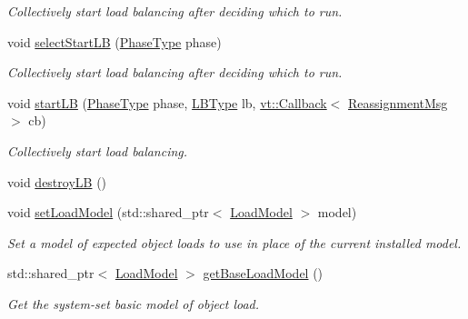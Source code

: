 \begin{DoxyCompactItemize}
\begin{DoxyCompactList}\small\item\em Collectively start load balancing after deciding which to run. \end{DoxyCompactList}\item 
void \hyperlink{structvt_1_1vrt_1_1collection_1_1balance_1_1_l_b_manager_aa21017c4513b87dccff2c3f0b12b00b4}{select\+Start\+LB} (\hyperlink{namespacevt_a46ce6733d5cdbd735d561b7b4029f6d7}{Phase\+Type} phase)
\begin{DoxyCompactList}\small\item\em Collectively start load balancing after deciding which to run. \end{DoxyCompactList}\item 
void \hyperlink{structvt_1_1vrt_1_1collection_1_1balance_1_1_l_b_manager_a9d93ed4b02b05ff1ed993ce2c6e92356}{start\+LB} (\hyperlink{namespacevt_a46ce6733d5cdbd735d561b7b4029f6d7}{Phase\+Type} phase, \hyperlink{namespacevt_1_1vrt_1_1collection_1_1balance_ac4f99693509affcc67db182d4aad9b5c}{L\+B\+Type} lb, \hyperlink{namespacevt_a57b238783d05de96bc2c4027f7073b7f}{vt\+::\+Callback}$<$ \hyperlink{structvt_1_1vrt_1_1collection_1_1balance_1_1_reassignment_msg}{Reassignment\+Msg} $>$ cb)
\begin{DoxyCompactList}\small\item\em Collectively start load balancing. \end{DoxyCompactList}\item 
void \hyperlink{structvt_1_1vrt_1_1collection_1_1balance_1_1_l_b_manager_ab66d9e597749a0a798278469f6afbd5b}{destroy\+LB} ()
\item 
void \hyperlink{structvt_1_1vrt_1_1collection_1_1balance_1_1_l_b_manager_a57813a70e0395907021a14c9e2bc1916}{set\+Load\+Model} (std\+::shared\+\_\+ptr$<$ \hyperlink{structvt_1_1vrt_1_1collection_1_1balance_1_1_load_model}{Load\+Model} $>$ model)
\begin{DoxyCompactList}\small\item\em Set a model of expected object loads to use in place of the current installed model. \end{DoxyCompactList}\item 
std\+::shared\+\_\+ptr$<$ \hyperlink{structvt_1_1vrt_1_1collection_1_1balance_1_1_load_model}{Load\+Model} $>$ \hyperlink{structvt_1_1vrt_1_1collection_1_1balance_1_1_l_b_manager_a9822187c2745a7b3b9c4a5929f8e3cc4}{get\+Base\+Load\+Model} ()
\begin{DoxyCompactList}\small\item\em Get the system-\/set basic model of object load. \end{DoxyCompactList}\item 

\end{DoxyCompactItemize}
